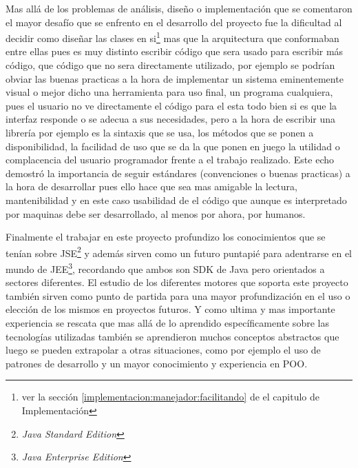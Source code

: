 Mas allá de los problemas de análisis, diseño o implementación que se comentaron
el mayor desafío que se enfrento en el desarrollo del proyecto fue la dificultad al decidir como diseñar las clases en si\footnote{ver la sección \ref{implementacion:manejador:facilitando} de el capitulo de Implementación} mas que la arquitectura que conformaban entre ellas pues es muy distinto escribir código que sera usado para escribir más código, que código que no sera directamente utilizado, por ejemplo se podrían obviar las buenas practicas a la hora de implementar un sistema eminentemente visual o mejor dicho una herramienta para uso final, un programa cualquiera, pues el usuario no ve directamente el código para el esta todo bien si es que la interfaz responde o se adecua a sus necesidades, pero a la hora de escribir una librería por ejemplo es la sintaxis que se usa, los métodos que se ponen a disponibilidad, la facilidad de uso que se da la que ponen en juego la utilidad o complacencia del usuario programador frente a el trabajo realizado. Este echo demostró la importancia de seguir estándares (convenciones o buenas practicas) a la hora de desarrollar pues ello hace que sea mas amigable la lectura, mantenibilidad y en este caso usabilidad de el código que aunque es interpretado por maquinas debe ser desarrollado, al menos por ahora, por humanos.

Finalmente el trabajar en este proyecto profundizo los conocimientos que se tenían sobre JSE\footnote{\textit{Java Standard Edition}} y además sirven como un futuro puntapié para adentrarse en el mundo de JEE\footnote{\textit{Java Enterprise Edition}}, recordando que ambos son SDK de Java pero orientados a sectores diferentes. El estudio de los diferentes motores que soporta este proyecto también sirven como punto de partida para una mayor profundización en el uso o elección de los mismos en proyectos futuros. Y como ultima y mas importante experiencia se rescata que mas allá de lo aprendido específicamente sobre las tecnologías utilizadas también se aprendieron muchos conceptos abstractos que luego se pueden extrapolar a otras situaciones, como por ejemplo el uso de patrones de desarrollo y un mayor conocimiento y experiencia en POO.